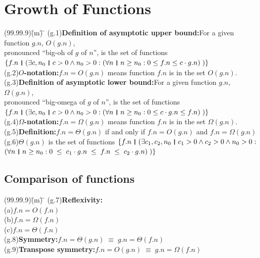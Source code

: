 \documentclass{amsart}
\newcommand{\lgap}{2pt}                             %
\newcommand{\llgap}{6pt}                            %
\newcommand{\equivs}{\ensuremath{\;\equiv\;}}       %
\newcommand{\thedr}{\rule[-.25ex]{.32mm}{1.75ex}}   %
\newcommand{\dr}{\;\,\thedr\,\;}                    %
\newcommand{\rb}{:}                                 %
\newcommand{\all}{\forall}                          %
\newcommand{\ext}{\exists}                          %
\begin{document}
\section*{Growth of Functions}
\begin{tabbing}
(99.99.9)\;\=(m)\;\= \makebox[2in]{ } \= \kill
(g.1)\>\textbf{Definition of asymptotic upper bound:}\quad For a given function $g.n$, \;$O(g.n)$,\\[\lgap]
     \> pronounced ``big-oh of $g$ of $n$'', is the set of functions\\[\lgap]
     \> $\{f.n \dr (\ext c,n_{0}\dr c>0 \land n_{0}>0 \rb (\all n \dr n\ge n_{0} \rb 0\le f.n\le c \cdot g.n)\;)\}$\\[\lgap]
(g.2)\>\textbf{$O$-notation:}\quad $f.n = O(g.n)$ means function $f.n$ is in the set $O(g.n).$\\[\llgap]
(g.3)\>\textbf{Definition of asymptotic lower bound:}\quad For a given function $g.n$, \;$\Omega(g.n)$,\\[\lgap]
     \> pronounced ``big-omega of $g$ of $n$'', is the set of functions\\[\lgap]
     \> $\{f.n \dr (\ext c,n_{0}\dr c>0 \land n_{0}>0 \rb (\all n \dr n\ge n_{0} \rb 0\le c \cdot g.n\le f.n)\;)\}$\\[\lgap]
(g.4)\>\textbf{$\Omega$-notation:}\quad $f.n = \Omega(g.n)$ means function $f.n$ is in the set $\Omega(g.n).$\\[\llgap]
(g.5)\>\textbf{Definition:}\quad $f.n = \Theta (g.n)$ if and only if $f.n = O(g.n)$ and $f.n = \Omega (g.n)$\\[\lgap]
(g.6)\>$\Theta (g.n)$ is the set of functions $\{f.n \dr (\ext c_{1},c_{2},n_{0}\dr c_{1}>0 \land c_{2}>0 \land n_{0}>0 \rb$\\[\lgap]
     \>$(\all n \dr n\ge n_{0} \rb 0 \;\le\; c_{1} \cdot g.n \;\le\; f.n \;\le\; c_{2} \cdot g.n)\;)\}$\\[\lgap]
     \end{tabbing}

\subsection*{Comparison of functions}
\begin{tabbing}
(99.99.9)\;\=(m)\;\= \makebox[2in]{ } \= \kill
(g.7)\>\textbf{Reflexivity:}\\[\lgap]
     \>(a)\>$f.n = O(f.n)$\\[\lgap]
     \>(b)\>$f.n = \Omega (f.n)$\\[\lgap]
     \>(c)\>$f.n = \Theta (f.n)$\\[\lgap]
(g.8)\>\textbf{Symmetry:}\quad $f.n = \Theta (g.n) \equivs g.n = \Theta (f.n)$\\[\lgap]
(g.9)\>\textbf{Transpose symmetry:}\quad $f.n = O(g.n) \equivs g.n = \Omega (f.n)$\\[\lgap]
\end{tabbing}
\end{document}
